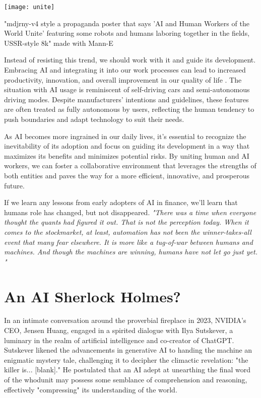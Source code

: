 \begin{pdf}
\begin{marginfigure}[-5.5cm]
    \texttt{[image: unite]}
        \caption{"mdjrny-v4 style a propaganda poster that says 'AI and Human Workers of the World Unite' featuring some robots and humans laboring together in the fields, USSR-style 8k" made with Mann-E}
\end{marginfigure}
\end{pdf}

Instead of resisting this trend, we should work with it and guide its development. Embracing AI and integrating it into our work processes can lead to increased productivity, innovation, and overall improvement in our quality of life . The situation with AI usage is reminiscent of self-driving cars and semi-autonomous driving modes. Despite manufacturers’ intentions and guidelines, these features are often treated as fully autonomous by users, reflecting the human tendency to push boundaries and adapt technology to suit their needs.

As AI becomes more ingrained in our daily lives, it's essential to recognize the inevitability of its adoption and focus on guiding its development in a way that maximizes its benefits and minimizes potential risks. By uniting human and AI workers, we can foster a collaborative environment that leverages the strengths of both entities and paves the way for a more efficient, innovative, and prosperous future.

If we learn any lessons from early adopters of AI in finance, we'll learn that humans role has changed, but not disappeared. \textit{"There was a time when everyone thought the quants had figured it out. That is not the perception today. When it comes to the stockmarket, at least, automation has not been the winner-takes-all event that many fear elsewhere. It is more like a tug-of-war between humans and machines. And though the machines are winning, humans have not let go just yet. "} 

\section {An AI Sherlock Holmes?}

In an intimate conversation around the proverbial fireplace in 2023, NVIDIA's CEO, Jensen Huang, engaged in a spirited dialogue with Ilya Sutskever, a luminary in the realm of artificial intelligence and co-creator of ChatGPT. Sutskever likened the advancements in generative AI to handing the machine an enigmatic mystery tale, challenging it to decipher the climactic revelation: "the killer is... [blank]." He postulated that an AI adept at unearthing the final word of the whodunit may possess some semblance of comprehension and reasoning, effectively "compressing" its understanding of the world.

